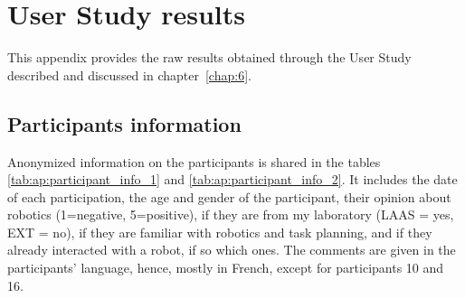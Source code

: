 \chapter{User Study results}
\label{ap:study}

This appendix provides the raw results obtained through the User Study described and discussed in chapter~\ref{chap:6}.

\section{Participants information}

Anonymized information on the participants is shared in the tables \ref{tab:ap:participant_info_1} and \ref{tab:ap:participant_info_2}. It includes the date of each participation, the age and gender of the participant, their opinion about robotics (1=negative, 5=positive), if they are from my laboratory (LAAS = yes, EXT = no), if they are familiar with robotics and task planning, and if they already interacted with a robot, if so which ones. The comments are given in the participants' language, hence, mostly in French, except for participants 10 and 16. 

